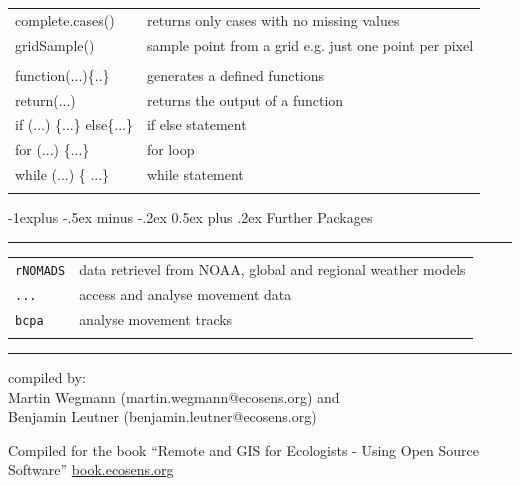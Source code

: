 \documentclass[10pt,landscape]{article}
\makeatletter
\renewcommand{\subsection}{\@startsection{subsection}{2}{0mm}%
                                {-1explus -.5ex minus -.2ex}%
                                {0.5ex plus .2ex}%
                                {\normalfont\normalsize\bfseries}}
\makeatother
\begin{document}
\begin{multicols}{3}
\begin{tabular}{@{}p{\the\MyLen}%
                @{}p{\linewidth-\the\MyLen}@{}}
complete.cases() &  returns only cases with no missing values \\                
gridSample() & sample point from a grid e.g. just one point per pixel \\

 & \\
function(...)\{..\} & generates a defined functions\\
return(...) & returns the output of a function \\
if (...) \{...\} else\{...\} & if else statement \\
for (...) \{...\} & for loop \\
while (...) \{ ...\} & while statement \\
 & \\


\end{tabular}

\subsection{Further Packages}

\rule{0.32\textwidth}{0.4pt}

\begin{tabular}{@{}ll@{}}
\verb!rNOMADS!    & data retrievel from NOAA, global and regional weather models \\
\verb!...!  & access and analyse movement data\\
\verb!bcpa!  & analyse movement tracks\\
& \\
\end{tabular}




\scriptsize

\rule{0.32\textwidth}{0.4pt}

\vspace{.2cm}

compiled by: \vspace{.2cm}\\Martin Wegmann (martin.wegmann@ecosens.org) and \\Benjamin Leutner (benjamin.leutner@ecosens.org) \\ \THEYEAR	

\vspace{.2cm}

Compiled for the book ``Remote and GIS for Ecologists - Using Open Source Software'' \url{book.ecosens.org}



\end{multicols}
\end{document}
